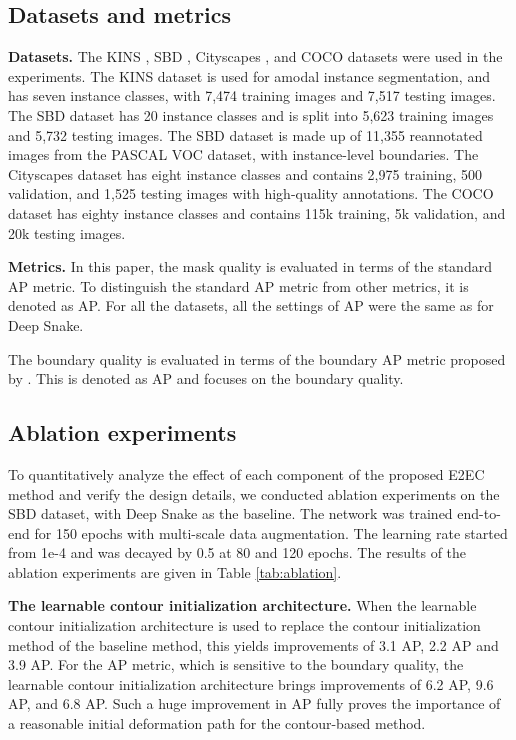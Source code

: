 \documentclass[10pt,twocolumn,letterpaper]{article}
\begin{document}
 \subsection{Datasets and metrics}
\textbf{Datasets.} The KINS \cite{kins}, SBD \cite{sbd}, Cityscapes \cite{cityscapes}, and COCO \cite{coco} datasets were used in the experiments. The KINS dataset is used for amodal instance segmentation, and has seven instance classes, with 7,474 training images and 7,517 testing images. The SBD dataset has 20 instance classes and is split into 5,623 training images and 5,732 testing images. The SBD dataset is made up of 11,355 reannotated images from the PASCAL VOC \cite{voc} dataset, with instance-level boundaries. The Cityscapes dataset has eight instance classes and contains 2,975 training, 500 validation, and 1,525 testing images with high-quality annotations. The COCO dataset has eighty instance classes and contains 115k training, 5k validation, and 20k testing images. 

\textbf{Metrics.} In this paper, the mask quality is evaluated in terms of the standard AP metric. To distinguish the standard AP metric from other metrics, it is denoted as AP. For all the datasets, all the settings of AP were the same as for Deep Snake.
 
The boundary quality is evaluated in terms of the boundary AP metric proposed by \cite{boundaryiou}. This is denoted as AP and focuses on the boundary quality.

\subsection{Ablation experiments}
To quantitatively analyze the effect of each component of the proposed E2EC method and verify the design details, we conducted ablation experiments on the SBD dataset, with Deep Snake as the baseline. The network was trained end-to-end for 150 epochs with multi-scale data augmentation. The learning rate started from 1e-4 and was decayed by 0.5 at 80 and 120 epochs. The results of the ablation experiments are given in Table \ref{tab:ablation}.

\textbf{The learnable contour initialization architecture.} When the learnable contour initialization architecture is used to replace the contour initialization method of the baseline method, this yields improvements of 3.1 AP, 2.2 AP and 3.9 AP. For the AP metric, which is sensitive to the boundary quality, the learnable contour initialization architecture brings improvements of 6.2 AP, 9.6 AP, and 6.8 AP. Such a huge improvement in AP fully proves the importance of a reasonable initial deformation path for the contour-based method.
\end{document}
